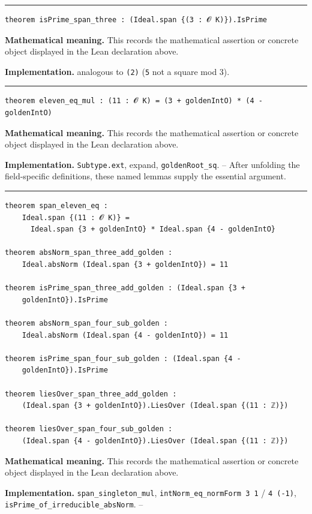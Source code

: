 \documentclass[UTF8,a4paper,11pt,fontset=fandol]{ctexart}
\theoremstyle{definition}
\newcommand{\statementsep}{\par\medskip\hrule\medskip}
\begin{document}
\statementsep
\begin{verbatim}
theorem isPrime_span_three : (Ideal.span {(3 : 𝓞 K)}).IsPrime
\end{verbatim}
\noindent\textbf{Mathematical meaning.} This records the mathematical assertion or concrete object displayed in the Lean declaration above.\par
\noindent\textbf{Implementation.} analogous to \texttt{(2)} (\texttt{5} not a square mod 3).\par
\statementsep
\begin{verbatim}
theorem eleven_eq_mul : (11 : 𝓞 K) = (3 + goldenIntO) * (4 - goldenIntO)
\end{verbatim}
\noindent\textbf{Mathematical meaning.} This records the mathematical assertion or concrete object displayed in the Lean declaration above.\par
\noindent\textbf{Implementation.} \texttt{Subtype.\allowbreak{}ext}, expand, \texttt{goldenRoot\_\allowbreak{}sq}. -- After unfolding the field-specific definitions, these named lemmas supply the essential argument.\par
\statementsep
\begin{verbatim}
theorem span_eleven_eq :
    Ideal.span {(11 : 𝓞 K)} =
      Ideal.span {3 + goldenIntO} * Ideal.span {4 - goldenIntO}

theorem absNorm_span_three_add_golden :
    Ideal.absNorm (Ideal.span {3 + goldenIntO}) = 11

theorem isPrime_span_three_add_golden : (Ideal.span {3 +
    goldenIntO}).IsPrime

theorem absNorm_span_four_sub_golden :
    Ideal.absNorm (Ideal.span {4 - goldenIntO}) = 11

theorem isPrime_span_four_sub_golden : (Ideal.span {4 -
    goldenIntO}).IsPrime

theorem liesOver_span_three_add_golden :
    (Ideal.span {3 + goldenIntO}).LiesOver (Ideal.span {(11 : ℤ)})

theorem liesOver_span_four_sub_golden :
    (Ideal.span {4 - goldenIntO}).LiesOver (Ideal.span {(11 : ℤ)})
\end{verbatim}
\noindent\textbf{Mathematical meaning.} This records the mathematical assertion or concrete object displayed in the Lean declaration above.\par
\noindent\textbf{Implementation.} \texttt{span\_\allowbreak{}singleton\_\allowbreak{}mul}, \texttt{intNorm\_\allowbreak{}eq\_\allowbreak{}normForm 3 1} / \texttt{4 (-1)}, \texttt{isPrime\_\allowbreak{}of\_\allowbreak{}irreducible\_\allowbreak{}absNorm}. --\par
\end{document}
